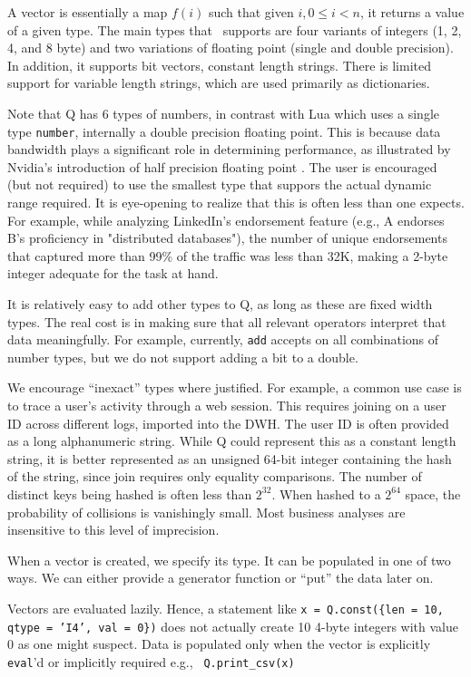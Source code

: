 A vector is essentially a map \(f(i)\) such that given \(i, 0 \leq i < n\), it
returns a value of a given type. The main types that \Q\ supports are four variants
of integers (1, 2, 4, and 8 byte) and two variations of floating point (single
and double precision). In addition, it supports bit vectors, constant length
strings. There is limited support for variable length strings, which are used
primarily as dictionaries. 

Note that Q has 6 types of numbers, in contrast with Lua which uses a 
single type {\tt number}, internally a double precision floating point.
This is because data bandwidth plays a significant role in determining
performance, as illustrated by Nvidia's
introduction of half precision floating point  \cite{nvidia2017}. The user is
encouraged (but not required) to use the smallest type that suppors the actual
dynamic range required. It is eye-opening to realize that this is often  less
than one expects. For example, while analyzing LinkedIn's endorsement feature
(e.g., A endorses B's proficiency in "distributed databases"), 
the number of unique endorsements that captured more than 99\% of the traffic
was less than 32K, making a 2-byte integer adequate for the task at hand.

It is relatively easy to add other types to Q, as long as these 
are fixed width types. The real cost is in making sure that all relevant
operators interpret that data meaningfully. For example, currently, {\tt add}
accepts on all combinations of number types, but we do not 
support adding a bit to a double.

We
encourage ``inexact'' types where justified. For example, a common use case is
to trace a user's activity through a web session. This requires joining on a
user ID across different logs, imported into the DWH.  The user ID is
often provided as a long alphanumeric string. While Q could represent this as a
constant length string, it is better represented as an unsigned 64-bit integer
containing the hash of the string, since join requires only equality comparisons.
The number of distinct keys being hashed is often less than \(2^{32}\). When
hashed to a \(2^{64}\) space, the probability of collisions is vanishingly
small. Most business analyses are insensitive to this level of imprecision.

When a vector is created, we specify its type. It can be populated in one of two
ways. We can either provide a generator function or ``put'' the data later on.

Vectors are evaluated lazily. Hence, a statement like 
{\tt x = Q.const(\{len = 10, qtype = 'I4', val = 0\})} does not actually create 10
4-byte integers with value 0 as one might suspect. Data is populated only when
the vector is explicitly {\tt eval}'d or implicitly required e.g., {\tt
Q.print\_csv(x)}

